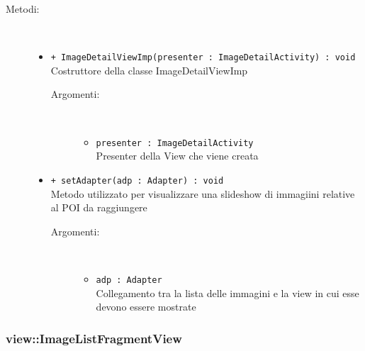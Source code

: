 \documentclass[../DefinizioneDiProdotto.tex]{subfiles}
\begin{document}
\begin{description}
\begin{itemize}
\end{itemize}
\item[Metodi:] \
\begin{itemize}
\item \texttt{+ ImageDetailViewImp(presenter : ImageDetailActivity) : void}\\
Costruttore della classe ImageDetailViewImp
 \begin{description}
\item[Argomenti:] \
\begin{itemize}
\item \texttt{presenter : ImageDetailActivity}\\
Presenter della View che viene creata\end{itemize}
\end{description}
\item \texttt{+ setAdapter(adp : Adapter) : void}\\
Metodo utilizzato per visualizzare una slideshow di immagiini relative al POI da raggiungere
 \begin{description}
\item[Argomenti:] \
\begin{itemize}
\item \texttt{adp : Adapter}\\
Collegamento tra la lista delle immagini e la view in cui esse devono essere mostrate\end{itemize}
\end{description}
\end{itemize}
\end{description}

\subsubsection{view::ImageListFragmentView}
\end{document}
